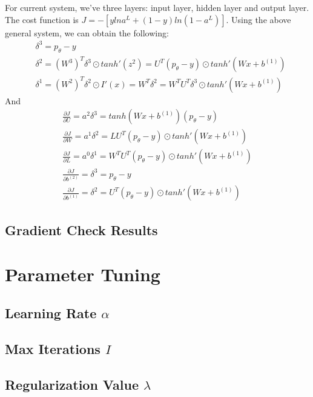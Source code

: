 \documentclass[11pt, oneside]{article}   	%
\begin{document}
For current system, we've three layers: input layer, hidden layer and output layer. The cost function is $J = - [y lna^L + (1-y) ln(1- a^L)]$. Using the above general system, we can obtain the following:
\begin{subequations}
\begin{align}
& \delta^3 =  p_{\theta} - y\\
& \delta^2 = (W^3)^T \delta^3 \odot tanh'(z^2) = U^T (p_{\theta} - y)  \odot tanh'(Wx + b^{(1)}) \\
& \delta^1 = (W^2)^T \delta^2  \odot I'(x)= W^T \delta^2 = W^T U^T \delta^3 \odot tanh'(Wx + b^{(1)})
\end{align}
\end{subequations}
And
\begin{subequations}
\begin{align}
\frac{\partial J}{ \partial U} = a^2 \delta^3 = tanh(Wx + b^{(1)}) (p_{\theta} - y) \\
\frac{\partial J}{ \partial W} = a^1 \delta^2 = LU^T(p_{\theta} - y) \odot tanh'(Wx + b^{(1)}) \\
\frac{\partial J}{ \partial L} = a^0 \delta^1 = W^T U^T (p_{\theta} - y) \odot tanh'(Wx + b^{(1)})  \\
\frac{\partial J}{ \partial b^{(2)}} = \delta^3 = p_{\theta} - y \\
\frac{\partial J}{ \partial b^{(1)}} = \delta^2 = U^T(p_{\theta} - y) \odot tanh'(Wx + b^{(1)}) 
\end{align}
\end{subequations}



\subsection{Gradient Check Results}



\section{Parameter Tuning}
\subsection{Learning Rate $\alpha$}
\subsection{Max Iterations $I$}
\subsection{Regularization Value $\lambda$}
\end{document}
